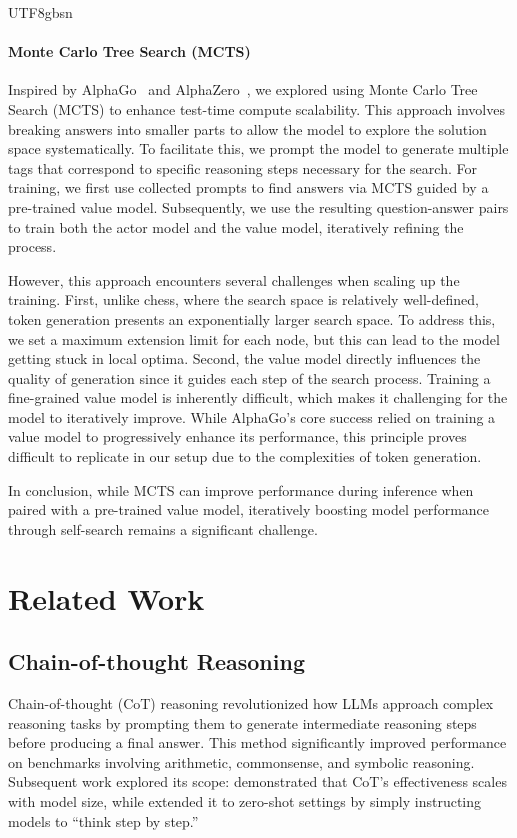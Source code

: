 \documentclass[11pt, a4paper, logo, copyright, nonumbering]{deepseek}
\begin{document}
\begin{CJK*}{UTF8}{gbsn}
\paragraph{Monte Carlo Tree Search (MCTS)}
Inspired by AlphaGo~\citep{alphago} and AlphaZero~\citep{alphazero}, we explored using Monte Carlo Tree Search (MCTS) to enhance test-time compute scalability. This approach involves breaking answers into smaller parts to allow the model to explore the solution space systematically. To facilitate this, we prompt the model to generate multiple tags that correspond to specific reasoning steps necessary for the search. For training, we first use collected prompts to find answers via MCTS guided by a pre-trained value model. Subsequently, we use the resulting question-answer pairs to train both the actor model and the value model, iteratively refining the process.

However, this approach encounters several challenges when scaling up the training. First, unlike chess, where the search space is relatively well-defined, token generation presents an exponentially larger search space. To address this, we set a maximum extension limit for each node, but this can lead to the model getting stuck in local optima. Second, the value model directly influences the quality of generation since it guides each step of the search process. Training a fine-grained value model is inherently difficult, which makes it challenging for the model to iteratively improve. While AlphaGo's core success relied on training a value model to progressively enhance its performance, this principle proves difficult to replicate in our setup due to the complexities of token generation.

In conclusion, while MCTS can improve performance during inference when paired with a pre-trained value model, iteratively boosting model performance through self-search remains a significant challenge.

\section{Related Work}

\subsection{Chain-of-thought Reasoning}
Chain-of-thought (CoT) reasoning \citep{wei2022chain} revolutionized how LLMs approach complex reasoning tasks by prompting them to generate intermediate reasoning steps before producing a final answer.
This method significantly improved performance on benchmarks involving arithmetic, commonsense, and symbolic reasoning. Subsequent work explored its scope: \citet{suzgun-etal-2023-challenging} demonstrated that CoT's effectiveness scales with model size, while \citet{kojima2022large} extended it to zero-shot settings by simply instructing models to ``think step by step.''


\end{CJK*}
\end{document}
